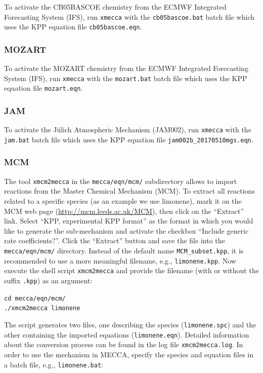 \documentclass[a4paper,twoside]{article}
\begin{document}
To activate the CB05BASCOE chemistry from the ECMWF Integrated
Forecasting System (IFS), run \verb|xmecca| with the
\verb|cb05bascoe.bat| batch file which uses the KPP equation file
\verb|cb05bascoe.eqn|.

\subsubsection{MOZART}
\label{sec:mozart}

To activate the MOZART chemistry from the ECMWF Integrated Forecasting
System (IFS), run \verb|xmecca| with the \verb|mozart.bat| batch file
which uses the KPP equation file \verb|mozart.eqn|.

\subsubsection{JAM}
\label{sec:jam}

To activate the J\"ulich Atmospheric Mechanism (JAM002), run
\verb|xmecca| with the \verb|jam.bat| batch file which uses the KPP
equation file \verb|jam002b_20170510mgs.eqn|.

\subsubsection{MCM}
\label{sec:mcm}

The tool \verb|xmcm2mecca| in the \verb|mecca/eqn/mcm/| subdirectory
allows to import reactions from the Master Chemical Mechanism (MCM). To
extract all reactions related to a specific species (as an example we
use limonene), mark it on the MCM web page
(\url{http://mcm.leeds.ac.uk/MCM}), then click on the ``Extract'' link.
Select ``KPP, experimental KPP format'' as the format in which you would
like to generate the sub-mechanism and activate the checkbox ``Include
generic rate coefficients?''. Click the ``Extract'' button and save the
file into the \verb|mecca/eqn/mcm/| directory. Instead of the default
name \verb|MCM_subset.kpp|, it is recommended to use a more meaningful
filename, e.g., \verb|limonene.kpp|. Now execute the shell script
\verb|xmcm2mecca| and provide the filename (with or without the suffix
\verb|.kpp|) as an argument:

\verb|cd mecca/eqn/mcm/|\\
\verb|./xmcm2mecca limonene|

The script generates two files, one describing the species
(\verb|limonene.spc|) and the other containing the imported equations
(\verb|limonene.eqn|). Detailed information about the conversion process
can be found in the log file \verb|xmcm2mecca.log|. In order to use the
mechanism in MECCA, specify the species and equation files in a batch
file, e.g., \verb|limonene.bat|:
\end{document}
